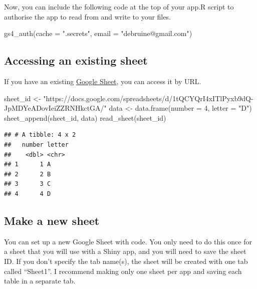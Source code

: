 \documentclass[
]{book}
\newenvironment{Shaded}{\begin{snugshade}}{\end{snugshade}}
\newcommand{\AttributeTok}[1]{\textcolor[rgb]{0.77,0.63,0.00}{#1}}
\newcommand{\DecValTok}[1]{\textcolor[rgb]{0.00,0.00,0.81}{#1}}
\newcommand{\FunctionTok}[1]{\textcolor[rgb]{0.00,0.00,0.00}{#1}}
\newcommand{\NormalTok}[1]{#1}
\newcommand{\OtherTok}[1]{\textcolor[rgb]{0.56,0.35,0.01}{#1}}
\newcommand{\StringTok}[1]{\textcolor[rgb]{0.31,0.60,0.02}{#1}}
\begin{document}
Now, you can include the following code at the top of your app.R script to authorise the app to read from and write to your files.

\begin{Shaded}
\begin{Highlighting}[]
\FunctionTok{gs4\_auth}\NormalTok{(}\AttributeTok{cache =} \StringTok{".secrets"}\NormalTok{, }\AttributeTok{email =} \StringTok{"debruine@gmail.com"}\NormalTok{)}
\end{Highlighting}
\end{Shaded}

\hypertarget{accessing-an-existing-sheet}{%
\subsection{Accessing an existing sheet}\label{accessing-an-existing-sheet}}

If you have an existing \href{https://docs.google.com/spreadsheets/u/0/}{Google Sheet}, you can access it by URL.

\begin{Shaded}
\begin{Highlighting}[]
\NormalTok{sheet\_id }\OtherTok{\textless{}{-}} \StringTok{"https://docs.google.com/spreadsheets/d/1tQCYQrI4xITlPyxb9dQ{-}JpMDYeADovIeiZZRNHkctGA/"}
\NormalTok{data }\OtherTok{\textless{}{-}} \FunctionTok{data.frame}\NormalTok{(}\AttributeTok{number =} \DecValTok{4}\NormalTok{, }\AttributeTok{letter =} \StringTok{"D"}\NormalTok{)}
\FunctionTok{sheet\_append}\NormalTok{(sheet\_id, data)}
\FunctionTok{read\_sheet}\NormalTok{(sheet\_id)}
\end{Highlighting}
\end{Shaded}

\begin{verbatim}
## # A tibble: 4 x 2
##   number letter
##    <dbl> <chr> 
## 1      1 A     
## 2      2 B     
## 3      3 C     
## 4      4 D
\end{verbatim}

\hypertarget{make-a-new-sheet}{%
\subsection{Make a new sheet}\label{make-a-new-sheet}}

You can set up a new Google Sheet with code. You only need to do this once for a sheet that you will use with a Shiny app, and you will need to save the sheet ID. If you don't specify the tab name(s), the sheet will be created with one tab called ``Sheet1''. I recommend making only one sheet per app and saving each table in a separate tab.
\end{document}
